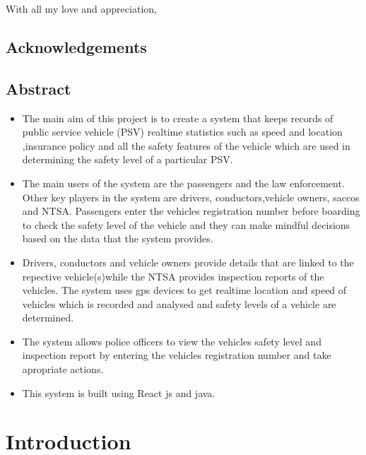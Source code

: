 \documentclass[a4paper, 12pt]{report}
\begin{document}
With all my love and appreciation,
\clearpage

\section{Acknowledgements}
\clearpage

\section{Abstract}
\begin{itemize}
\item The main aim of this project is to create a system that keeps records of
public service vehicle (PSV) realtime statistics such as speed and location
,insurance policy and all the safety features of the vehicle which are used in
determining the safety level of a particular PSV.
\item The main users of the system are the passengers and the law enforcement.
Other key players in the system are drivers, conductors,vehicle owners, saccos and NTSA. Passengers enter the vehicles registration number before
boarding to check the safety level of the vehicle and they can make mindful
decisions based on the data that the system provides.

\item Drivers, conductors and vehicle owners provide details that are linked to
the repective vehicle(s)while the NTSA provides inspection reports of the
vehicles. The system uses gps devices to get realtime location and speed
of vehicles which is recorded and analysed and safety levels of a vehicle are
determined.
\item The system allows police officers to view the vehicles safety level and inspection report by entering the vehicles registration number and take apropriate
actions.
\item This system is built using React js and java.
\end{itemize}
\clearpage

\tableofcontents
\thispagestyle{empty}
\clearpage

\chapter{Introduction}
\end{document}
